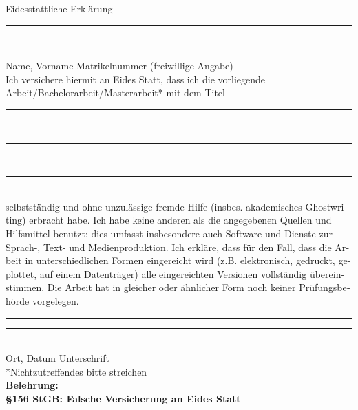 
\begin{otherlanguage}{ngerman}

\begin{center} {\LARGE Eidesstattliche Erklärung} \end{center}


\noindent\rule[1ex]{30ex}{1pt} \hspace{15ex} \rule[1ex]{30ex}{1pt}\vspace{-0.2cm}\\
\phantom{}\hspace{6ex} Name, Vorname  \hspace{20.5ex} Matrikelnummer (freiwillige Angabe)\vspace{0.1cm}\\
Ich versichere hiermit an Eides Statt, dass ich die vorliegende Arbeit/Bachelorarbeit/Masterarbeit* mit dem Titel \vspace{0.2cm}\\
\noindent \rule[1ex]{\textwidth}{1pt}\\
\noindent \rule[1ex]{\textwidth}{1pt}\\
\noindent \rule[1ex]{\textwidth}{1pt}\\
selbstständig und ohne unzulässige fremde Hilfe (insbes. akademisches Ghostwriting) erbracht habe.
Ich habe keine anderen als die angegebenen Quellen und Hilfsmittel benutzt; dies umfasst
insbesondere auch Software und Dienste zur Sprach-, Text- und Medienproduktion. Ich erkläre, dass
für den Fall, dass die Arbeit in unterschiedlichen Formen eingereicht wird (z.B. elektronisch, gedruckt,
geplottet, auf einem Datenträger) alle eingereichten Versionen vollständig übereinstimmen. Die Arbeit
hat in gleicher oder ähnlicher Form noch keiner Prüfungsbehörde vorgelegen.\vspace{-0.2cm}\\

\noindent\rule[1ex]{30ex}{1pt} \hspace{15ex} \rule[1ex]{30ex}{1pt}\vspace{-0.2cm}\\
\phantom{}\hspace{6ex} Ort, Datum  \hspace{37.5ex} Unterschrift \vspace{0.1cm}\\
*Nichtzutreffendes bitte streichen\vspace{0.1cm}\\
\textbf{Belehrung:}\\
\textbf{\S 156 StGB: Falsche Versicherung an Eides Statt}


\end{otherlanguage}
